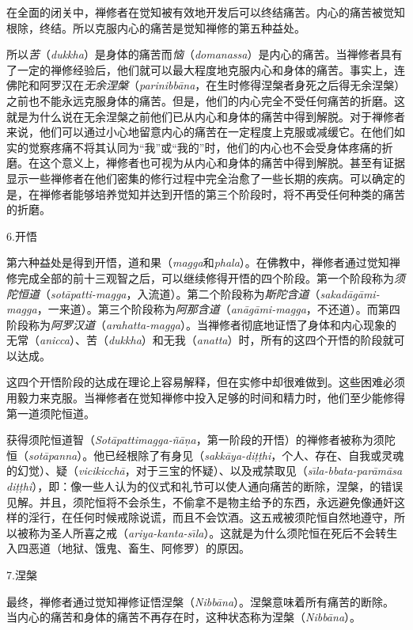 在全面的闭关中，禅修者在觉知被有效地开发后可以终结痛苦。内心的痛苦被觉知根除，终结。所以克服内心的痛苦是觉知禅修的第五种益处。

\1所以{\it 苦}（{\it dukkha}）是身体的痛苦而{\it 恼}（{\it domanassa}）是内心的痛苦。当禅修者具有了一定的禅修经验后，他们就可以最大程度地克服内心和身体的痛苦。事实上，连佛陀和阿罗汉在{\it 无余涅槃}（{\it parinibb\= ana}，在生时修得涅槃者身死之后得无余涅槃）之前也不能永远克服身体的痛苦。但是，他们的内心完全不受任何痛苦的折磨。这就是为什么说在无余涅槃之前他们已从内心和身体的痛苦中得到解脱。对于禅修者来说，他们可以通过小心地留意内心的痛苦在一定程度上克服或减缓它。在他们如实的觉察疼痛不将其认同为“我”或“我的”时，他们的内心也不会受身体疼痛的折磨。在这个意义上，禅修者也可视为从内心和身体的痛苦中得到解脱。甚至有证据显示一些禅修者在他们密集的修行过程中完全治愈了一些长期的疾病。可以确定的是，在禅修者能够培养觉知并达到开悟的第三个阶段时，将不再受任何种类的痛苦的折磨。

\sssubsectnon 6.开悟

第六种益处是得到开悟，道和果（{\it magga}和{\it phala}）。在佛教中，禅修者通过觉知禅修完成全部的前十三观智之后，可以继续修得开悟的四个阶段。第一个阶段称为{\it 须陀恒道}（{\it sot\=apatti-magga}，入流道）。第二个阶段称为{\it 斯陀含道}（{\it sakad\=ag\=ami-magga}，一来道）。第三个阶段称为{\it 阿那含道}（{\it an\=ag\=ami-magga}，不还道）。而第四阶段称为{\it 阿罗汉道}（{\it arahatta-magga}）。当禅修者彻底地证悟了身体和内心现象的无常（{\it anicca}）、苦（{\it dukkha}）和\1无我（{\it anatta}）时，所有的这四个开悟的阶段就可以达成。

这四个开悟阶段的达成在理论上容易解释，但在实修中却很难做到。这些困难必须用毅力来克服。当禅修者在觉知禅修中投入足够的时间和精力时，他们至少能修得第一道须陀恒道。

获得须陀恒道智（{\it Sot\=apattimagga-\~n\=a\d na}，第一阶段的开悟）的禅修者被称为须陀恒（{\it sot\=apanna}）。他已经根除了有身见（{\it sakk\=aya-di\d t\d thi}，个人、存在、自我或灵魂的幻觉）、疑（{\it vicikicch\=a}，对于三宝的怀疑）、以及戒禁取见（{\it s\=\i la-bbata-par\=am\=asa di\d t\d thi}），即：像一些人认为的仪式和礼节可以使人通向痛苦的断除，涅槃，的错误见解。并且，须陀恒将不会杀生，不偷拿不是物主给予的东西，永远避免像通奸这样的淫行，在任何时候戒除说谎，而且不会饮酒。这五戒被须陀恒自然地遵守，所以被称为圣人所喜之戒（{\it ariya-kanta-s\=\i la}）。这就是为什么须陀恒在死后不会转生入四恶道（地狱、饿鬼、畜生、阿修罗）的原因。

\sssubsectnon 7.涅槃

最终，禅修者通过觉知禅修证悟涅槃（{\it Nibb\=ana}）。涅槃意味着所有痛苦的断除。当内心的痛苦和身体的痛苦不再存在时，这种状态称为涅槃（{\it Nibb\=ana}）。

